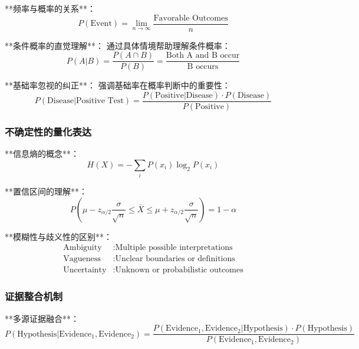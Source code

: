 **频率与概率的关系**：
\begin{equation}
P(\text{Event}) = \lim_{n \to \infty} \frac{\text{Favorable Outcomes}}{n}
\end{equation}

**条件概率的直觉理解**：
通过具体情境帮助理解条件概率：
\begin{equation}
P(A|B) = \frac{P(A \cap B)}{P(B)} = \frac{\text{Both A and B occur}}{\text{B occurs}}
\end{equation}

**基础率忽视的纠正**：
强调基础率在概率判断中的重要性：
\begin{equation}
P(\text{Disease}|\text{Positive Test}) = \frac{P(\text{Positive}|\text{Disease}) \cdot P(\text{Disease})}{P(\text{Positive})}
\end{equation}

\subsubsection{不确定性的量化表达} %

**信息熵的概念**：
\begin{equation}
H(X) = -\sum_{i} P(x_i) \log_2 P(x_i)
\end{equation}

**置信区间的理解**：
\begin{equation}
P(\mu - z_{\alpha/2} \frac{\sigma}{\sqrt{n}} \leq \bar{X} \leq \mu + z_{\alpha/2} \frac{\sigma}{\sqrt{n}}) = 1 - \alpha
\end{equation}

**模糊性与歧义性的区别**：
\begin{align}
\text{Ambiguity} &: \text{Multiple possible interpretations} \\
\text{Vagueness} &: \text{Unclear boundaries or definitions} \\
\text{Uncertainty} &: \text{Unknown or probabilistic outcomes}
\end{align}

\subsubsection{证据整合机制} %

**多源证据融合**：
\begin{equation}
P(\text{Hypothesis}|\text{Evidence}_1, \text{Evidence}_2) = \frac{P(\text{Evidence}_1, \text{Evidence}_2|\text{Hypothesis}) \cdot P(\text{Hypothesis})}{P(\text{Evidence}_1, \text{Evidence}_2)}
\end{equation}

